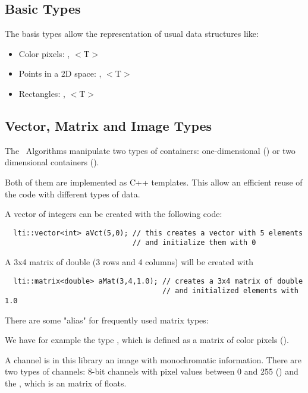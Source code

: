 \subsection{Basic Types}\label{basictypes}


The basis types allow the representation of usual data structures like:

\begin{itemize}
\item
Color pixels: , $<$T$>$\item
Points in a 2D space: , $<$T$>$\item
Rectangles: , $<$T$>$\end{itemize}

\subsection{Vector, Matrix and Image Types}\label{img}

The \ltilib\ Algorithms manipulate two types of containers: one-dimensional
() or two dimensional containers ().

Both of them are implemented as C++ templates. This allow an efficient reuse of the code with different types of data.

A vector of integers can be created with the following code:

\footnotesize\begin{verbatim}  lti::vector<int> aVct(5,0); // this creates a vector with 5 elements
                              // and initialize them with 0\end{verbatim}\normalsize


A 3x4 matrix of double (3 rows and 4 columns) will be created with

\footnotesize\begin{verbatim}  lti::matrix<double> aMat(3,4,1.0); // creates a 3x4 matrix of double
                                     // and initialized elements with 1.0\end{verbatim}\normalsize


There are some "alias" for frequently used matrix types:

We have for example the type , which is defined as a matrix
of color pixels ().

A channel is in this library an image with monochromatic information. There are two types of channels: 8-bit channels with pixel  values between 0 and 255 () and the , which is an matrix of floats.

